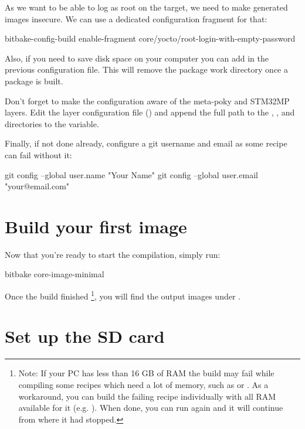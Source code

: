 As we want to be able to log as root on the target, we need to make generated
images insecure. We can use a dedicated configuration fragment for that:
\begin{bashinput}
bitbake-config-build enable-fragment core/yocto/root-login-with-empty-password
\end{bashinput}

Also, if you need to save disk space on your computer you can add  in the previous configuration file. This will remove the
package work directory once a package is built.

Don't forget to make the configuration aware of the meta-poky and STM32MP
layers.
Edit the layer configuration file () and
append the full path to the
,
,
and 
directories to the  variable.

Finally, if not done already, configure a git username and email as some recipe
can fail without it:
\begin{bashinput}
git config --global user.name "Your Name"
git config --global user.email "your@email.com"
\end{bashinput}

\section{Build your first image}

Now that you're ready to start the compilation, simply run:
\begin{bashinput}
bitbake core-image-minimal
\end{bashinput}

Once the build finished%
%
\footnote{Note: If your PC has less than 16 GB of
RAM the build may fail while compiling some recipes which need a lot of
memory, such as  or . As a
workaround, you can build the failing recipe individually with all RAM
available for it (e.g. ). When done, you can
run  again and it will continue from where
it had stopped.},
%
you will find the output images under
.

\section{Set up the SD card}

